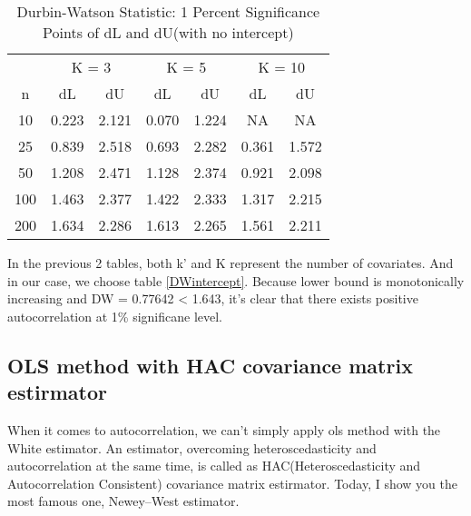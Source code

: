 \documentclass{article}
\theoremstyle{definition}
\begin{document}
\begin{table}[htb] \centering 
	\caption{Durbin-Watson Statistic: 1 Percent Significance Points of dL and dU(with no intercept)} 
	\label{DWnointercept} 
	\small 
	\begin{tabular}{@{}ccccccc@{}}
		\cmidrule(r){1-7}
		& \multicolumn{2}{c}{K = 3}                   & \multicolumn{2}{c}{K = 5}                   & \multicolumn{2}{c}{K = 10}                  \\ \cmidrule(r){1-7}
		n                    & dL                   & dU                   & dL                   & dU                   & dL                   & dU                   \\
		10                   & 0.223                & 2.121                & 0.070                & 1.224                & NA                   & NA                   \\
		25                   & 0.839                & 2.518                & 0.693                & 2.282                & 0.361                & 1.572                \\
		50                   & 1.208                & 2.471                & 1.128                & 2.374                & 0.921                & 2.098                \\
		100                  & 1.463                & 2.377                & 1.422                & 2.333                & 1.317                & 2.215                \\
		200                  & 1.634                & 2.286                & 1.613                & 2.265                & 1.561                & 2.211                \\ \cmidrule(r){1-7}
	\end{tabular}
\end{table}

In the previous 2 tables, both k' and K represent the number of covariates. And in our case, we choose table \ref{DWintercept}. Because lower bound is monotonically increasing and DW = 0.77642 < 1.643, it's clear that there exists positive autocorrelation at 1\% significane level.




\subsection{OLS method with HAC covariance matrix estirmator}

When it comes to autocorrelation, we can't simply apply ols method with the White estimator. An estimator, overcoming heteroscedasticity and autocorrelation at the same time, is called as HAC(Heteroscedasticity and Autocorrelation Consistent) covariance matrix estirmator. Today, I show you the most famous one, Newey–West estimator.\\
\end{document}
